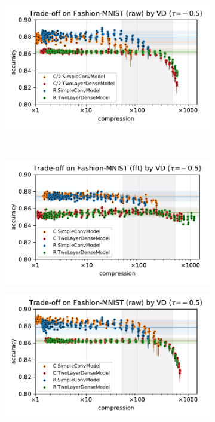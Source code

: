 \documentclass[a4paper,10pt,onecolumn]{article}
\begin{document}
\begin{figure}[b]
\begin{subfigure}[b]{0.5\columnwidth}
  \end{subfigure}%
  \begin{subfigure}[b]{0.5\columnwidth}
    \centering
    \includegraphics[width=\columnwidth]{figure__mnist-like__trade-off/appendix__cmp__VD__fashionmnist__raw__-0.5.pdf}
  \end{subfigure} \\ %
  \begin{subfigure}[b]{0.5\columnwidth}
    \centering
    \includegraphics[width=\columnwidth]{figure__mnist-like__trade-off/appendix__VD__fashionmnist__fft__-0.5.pdf}
  \end{subfigure}%
  \begin{subfigure}[b]{0.5\columnwidth}
    \centering
    \includegraphics[width=\columnwidth]{figure__mnist-like__trade-off/appendix__VD__fashionmnist__raw__-0.5.pdf}

\end{subfigure}
\end{figure}
\end{document}
